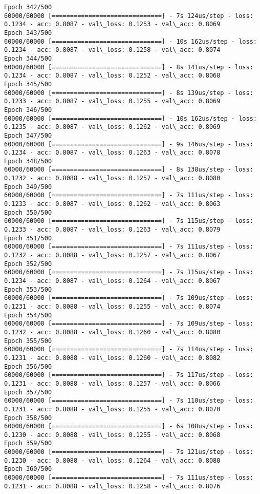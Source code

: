 \documentclass[11pt]{article}
\begin{document}
\begin{Verbatim}[commandchars=\\\{\}]
Epoch 342/500
60000/60000 [==============================] - 7s 124us/step - loss: 0.1234 - acc: 0.8087 - val\_loss: 0.1253 - val\_acc: 0.8069
Epoch 343/500
60000/60000 [==============================] - 10s 162us/step - loss: 0.1234 - acc: 0.8087 - val\_loss: 0.1258 - val\_acc: 0.8074
Epoch 344/500
60000/60000 [==============================] - 8s 141us/step - loss: 0.1234 - acc: 0.8087 - val\_loss: 0.1252 - val\_acc: 0.8068
Epoch 345/500
60000/60000 [==============================] - 8s 139us/step - loss: 0.1233 - acc: 0.8087 - val\_loss: 0.1255 - val\_acc: 0.8069
Epoch 346/500
60000/60000 [==============================] - 10s 162us/step - loss: 0.1235 - acc: 0.8087 - val\_loss: 0.1262 - val\_acc: 0.8069
Epoch 347/500
60000/60000 [==============================] - 9s 146us/step - loss: 0.1234 - acc: 0.8087 - val\_loss: 0.1263 - val\_acc: 0.8078
Epoch 348/500
60000/60000 [==============================] - 8s 138us/step - loss: 0.1232 - acc: 0.8088 - val\_loss: 0.1257 - val\_acc: 0.8080
Epoch 349/500
60000/60000 [==============================] - 7s 111us/step - loss: 0.1233 - acc: 0.8087 - val\_loss: 0.1262 - val\_acc: 0.8063
Epoch 350/500
60000/60000 [==============================] - 7s 115us/step - loss: 0.1233 - acc: 0.8087 - val\_loss: 0.1263 - val\_acc: 0.8079
Epoch 351/500
60000/60000 [==============================] - 7s 111us/step - loss: 0.1232 - acc: 0.8088 - val\_loss: 0.1257 - val\_acc: 0.8067
Epoch 352/500
60000/60000 [==============================] - 7s 115us/step - loss: 0.1234 - acc: 0.8087 - val\_loss: 0.1264 - val\_acc: 0.8067
Epoch 353/500
60000/60000 [==============================] - 7s 109us/step - loss: 0.1231 - acc: 0.8088 - val\_loss: 0.1255 - val\_acc: 0.8074
Epoch 354/500
60000/60000 [==============================] - 7s 109us/step - loss: 0.1232 - acc: 0.8088 - val\_loss: 0.1260 - val\_acc: 0.8080
Epoch 355/500
60000/60000 [==============================] - 7s 114us/step - loss: 0.1231 - acc: 0.8088 - val\_loss: 0.1260 - val\_acc: 0.8082
Epoch 356/500
60000/60000 [==============================] - 7s 117us/step - loss: 0.1231 - acc: 0.8088 - val\_loss: 0.1257 - val\_acc: 0.8066
Epoch 357/500
60000/60000 [==============================] - 7s 110us/step - loss: 0.1231 - acc: 0.8088 - val\_loss: 0.1255 - val\_acc: 0.8070
Epoch 358/500
60000/60000 [==============================] - 6s 108us/step - loss: 0.1230 - acc: 0.8088 - val\_loss: 0.1255 - val\_acc: 0.8068
Epoch 359/500
60000/60000 [==============================] - 7s 121us/step - loss: 0.1230 - acc: 0.8088 - val\_loss: 0.1264 - val\_acc: 0.8080
Epoch 360/500
60000/60000 [==============================] - 7s 111us/step - loss: 0.1231 - acc: 0.8088 - val\_loss: 0.1258 - val\_acc: 0.8076

\end{Verbatim}
\end{document}
